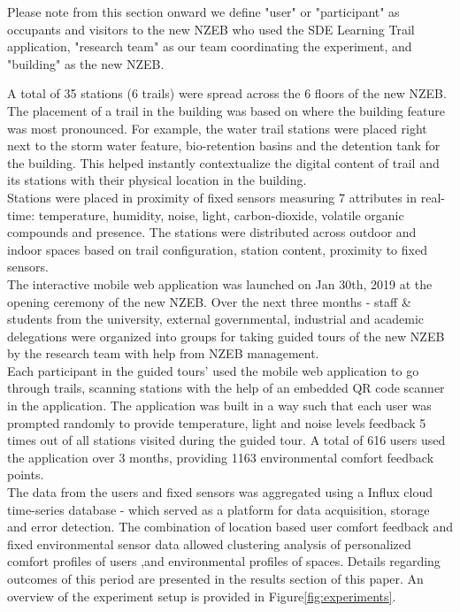 
Please note from this section onward we define "user" or "participant" as occupants and visitors to the new NZEB who used the SDE Learning Trail application, "research team" as our team coordinating the experiment, and "building" as the new NZEB. 

A total of 35 stations (6 trails) were spread across the 6 floors of the new NZEB. The placement of a trail in the building was based on where the building feature was most pronounced. For example, the water trail stations were placed right next to the storm water feature, bio-retention basins and the detention tank for the building. This helped instantly contextualize the digital content of trail and its stations with their physical location in the building.\\

Stations were placed in proximity of fixed sensors measuring 7 attributes in real-time: temperature, humidity, noise, light, carbon-dioxide, volatile organic compounds and presence. The stations were distributed across outdoor and indoor spaces based on trail configuration, station content, proximity to fixed sensors.\\

The interactive mobile web application was launched on Jan 30th, 2019 at the opening ceremony of the new NZEB. Over the next three months - staff \& students from the university, external governmental, industrial and academic delegations were organized into groups for taking guided tours of the new NZEB by the research team with help from NZEB management.\\

Each participant in the guided tours' used the mobile web application to go through trails, scanning stations with the help of an embedded QR code scanner in the application. The application was built in a way such that each user was prompted randomly to provide temperature, light and noise levels feedback 5 times out of all stations visited during the guided tour. A total of 616 users used the application over 3 months, providing 1163 environmental comfort feedback points.\\

The data from the users and fixed sensors was aggregated using a Influx cloud time-series database - which served as a platform for data acquisition, storage and error detection. The combination of location based user comfort feedback and fixed environmental sensor data allowed clustering analysis of personalized comfort profiles of users ,and environmental profiles of spaces. Details regarding outcomes of this period are presented in the results section of this paper. An overview of the experiment setup is provided in Figure\ref{fig:experiments}.\\



